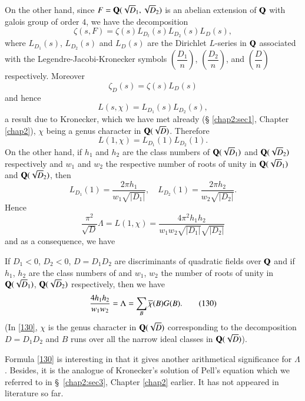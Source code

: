 On the other hand, since $F=\mathbf{Q}(\sqrt{D}_{1},\sqrt{D}_{2})$ is an
abelian extension of $\mathbf{Q}$ with galois group of order $4$, we have the
decomposition
$$
\zeta(s,F)=\zeta(s)L_{D_{t}}(s)L_{D_{2}}(s)L_{D}(s),
$$
where $L_{D_{1}}(s)$, $L_{D_{2}}(s)$ and $L_{D}(s)$ are the Dirichlet
$L$-series in $\mathbf{Q}$ associated with the Legendre-Jacobi-Kronecker
symbols $\left(\dfrac{D_{1}}{n}\right)$,
$\left(\dfrac{D_{2}}{n}\right)$, and $\left(\dfrac{D}{n}\right)$
respectively. Moreover
$$
\zeta_{D}(s)=\zeta(s)L_{D}(s)
$$\pageoriginale 
and hence
$$
L(s,\chi)=L_{D_{1}}(s)L_{D_{2}}(s),
$$
a result due to Kronecker, which we have met already (\S
\ref{chap2:sec1}, Chapter \ref{chap2}), $\chi$ being a genus character
in $\mathbf{Q}(\sqrt{D})$. Therefore  
$$
L(1,\chi)=L_{D_{1}}(1)L_{D_{2}}(1).
$$
On the other hand, if $h_{1}$ and $h_{2}$ are the class numbers of
$\mathbf{Q}(\sqrt{D}_{1})$ and $\mathbf{Q}(\sqrt{D}_{2})$ respectively and $w_{1}$
and $w_{2}$ the respective number of roots of unity in
$\mathbf{Q}(\sqrt{D}_{1})$ and $\mathbf{Q}(\sqrt{D}_{2})$, then 
$$
L_{D_{1}}(1)=\frac{2\pi h_{1}}{w_{1}\sqrt{|D_{1}|}},\quad
L_{D_{2}}(1)=\frac{2\pi h_{2}}{w_{2}\sqrt{|D_{2}|}}.
$$
Hence
$$
\frac{\pi^{2}}{\sqrt{D}}\Lambda=L(1,\chi)=\frac{4\pi^{2}h_{1}h_{2}}{w_{1}w_{2}\sqrt{|D_{1}|}\sqrt{|D_{2}|}}
$$
and as a consequence, we have

\begin{proposition}\label{prop18}
If $D_{1}<0$, $D_{2}<0$, $D=D_{1}D_{2}$ are discriminants of quadratic
fields over $\mathbf{Q}$ and if $h_{1}$, $h_{2}$ are the class numbers of and
$w_{1}$, $w_{2}$ the number of roots of unity in $\mathbf{Q}(\sqrt{D}_{1})$,
$\mathbf{Q}(\sqrt{D}_{2})$ respectively, then we have
\begin{equation*}
\frac{4h_{1}h_{2}}{w_{1}w_{2}}=\Lambda=\sum_{B}\overline{\chi}(B)G(B).\tag{130}\label{130} 
\end{equation*}
(In \eqref{130}, $\chi$ is the genus character in $\mathbf{Q}(\sqrt{D})$
corresponding to the decomposition $D=D_{1}D_{2}$ and $B$ runs over
all the narrow ideal classes in $\mathbf{Q}(\sqrt{D})$).
\end{proposition}

\begin{remark*}
Formula \eqref{130} is interesting in that it gives another
arithmetical significance for $\Lambda$. Besides, it is the analogue
of Kronecker's solution of Pell's equation which we referred to in
\S\ \ref{chap2:sec3}, Chapter \ref{chap2} earlier. It has not appeared
in literature so far. 
\end{remark*}

